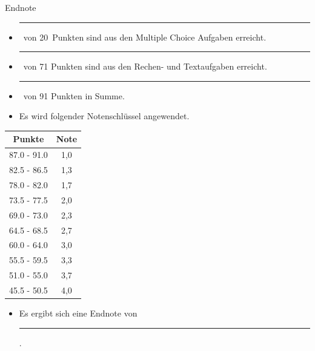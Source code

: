 \documentclass[a4paper, 9pt]{scrartcl}\usepackage[]{graphicx}\usepackage[]{xcolor}
\begin{document}
\begin{graybox}{Endnote}
  \vspace{1Ex}
  \begin{itemize}
  \item[] \rule[0ex]{3em}{.4pt}\, von 20\, Punkten sind aus den Multiple
    Choice Aufgaben erreicht.
  \item[] \rule[0ex]{3em}{.4pt}\, von 71 Punkten sind aus den Rechen- und
    Textaufgaben erreicht. 
  \item[] \rule[0ex]{3em}{.4pt}\, von 91 Punkten in Summe.
  \item[] Es wird folgender Notenschlüssel angewendet.   
  \end{itemize}
  \vspace{1ex}
\begin{center}
  \begin{tabular}[c]{cc}
    \toprule
    \textbf{Punkte}	&	\textbf{Note}	\\
    \midrule
    87.0 - 91.0	&	1,0	\\
    82.5 - 86.5	&	1,3	\\
    78.0 - 82.0	&	1,7	\\
    73.5 - 77.5	&	2,0	\\
    69.0 - 73.0	&	2,3	\\
    64.5 - 68.5	&	2,7	\\
    60.0 - 64.0	&	3,0	\\
    55.5 - 59.5	&	3,3	\\
    51.0 - 55.0	&	3,7	\\
    45.5 - 50.5	&	4,0	\\
    \bottomrule
  \end{tabular}
\end{center}
  \vspace{1ex}
\begin{itemize}
\item[] Es ergibt sich eine Endnote von \rule[0ex]{4em}{.4pt}.
\end{itemize}
  \vspace{1Ex}
\end{graybox}

\newpage
\end{document}
